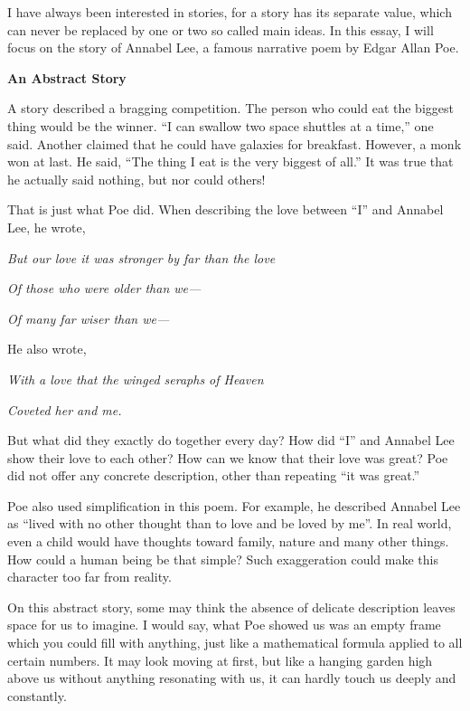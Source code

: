 \par I have always been interested in stories, for a story has its separate value, which can never be replaced by one or two so called main ideas. In this essay, I will focus on the story of Annabel Lee, a famous narrative poem by Edgar Allan Poe.
\par \textbf{An Abstract Story}
\par A story described a bragging competition. The person who could eat the biggest thing would be the winner. ``I can swallow two space shuttles at a time,'' one said. Another claimed that he could have galaxies for breakfast. However, a monk won at last. He said, ``The thing I eat is the very biggest of all.'' It was true that he actually said nothing, but nor could others!
\par That is just what Poe did. When describing the love between ``I'' and Annabel Lee, he wrote, 
\par \setlength{\parindent}{2em}\emph{But our love it was stronger by far than the love}
\par \emph{Of those who were older than we—}
\par \emph{Of many far wiser than we—}
\par \setlength{\parindent}{0em}He also wrote,
\par \setlength{\parindent}{2em}\emph{With a love that the winged seraphs of Heaven}
\par \emph{Coveted her and me.}
\par \setlength{\parindent}{0em}But what did they exactly do together every day? How did ``I'' and Annabel Lee show their love to each other? How can we know that their love was great? Poe did not offer any concrete description, other than repeating ``it was great.''
\par Poe also used simplification in this poem. For example, he described Annabel Lee as ``lived with no other thought than to love and be loved by me''. In real world, even a child would have thoughts toward family, nature and many other things. How could a human being be that simple? Such exaggeration could make this character too far from reality.
\par On this abstract story, some may think the absence of delicate description leaves space for us to imagine. I would say, what Poe showed us was an empty frame which you could fill  with anything, just like a mathematical formula applied to all certain numbers. It may look moving at first, but like a hanging garden high above us without anything resonating with us, it can hardly touch us deeply and constantly.

